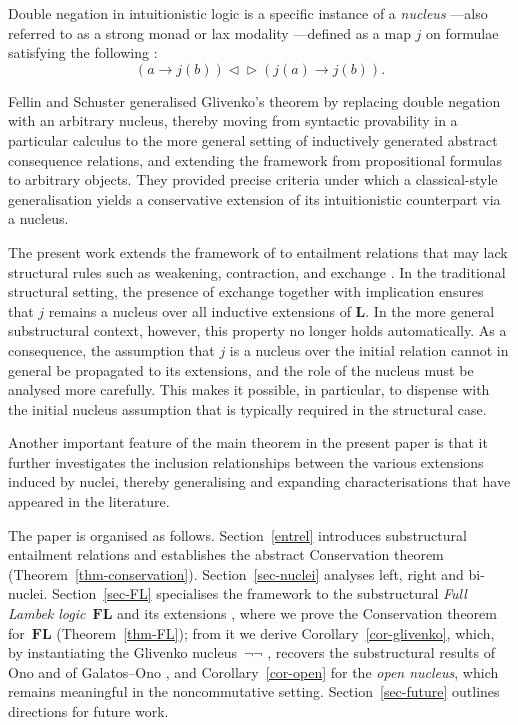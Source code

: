 \documentclass[runningheads]{llncs}
\newcommand{\FL}{\mathbf{FL}}
\begin{document}
Double negation in intuitionistic logic is a specific instance of a \emph{nucleus} \cite{aczel:aspects,hayk:more,joh:sto,negri:cont,rosen,simm:frame,simm:cur}---also referred to as a strong monad \cite{kock:sdg} or lax modality \cite{aczel_2001}---defined as a map $j$ on formulae satisfying the following \cite{van:kuroda}:
\[
(a \to j(b)) \lhd\!\!\rhd (j(a) \to j(b)).
\]

Fellin and Schuster \cite{fel:nuclei,fel:cat} generalised Glivenko's theorem by replacing double negation with an arbitrary nucleus, thereby moving from syntactic provability in a particular calculus to the more general setting of inductively generated abstract consequence relations, and extending the framework from propositional formulas to arbitrary objects. They provided precise criteria under which a classical-style generalisation yields a conservative extension of its intuitionistic counterpart via a nucleus.

The present work extends the framework of \cite{fel:nuclei,fel:cat} to entailment relations that may lack structural rules such as weakening, contraction, and exchange \cite{PAOLI,restall:sub}. In the traditional structural setting, the presence of exchange together with implication ensures that $j$ remains a nucleus over all inductive extensions of $\mathbf{L}$. In the more general substructural context, however, this property no longer holds automatically. As a consequence, the assumption that $j$ is a nucleus over the initial relation cannot in general be propagated to its extensions, and the role of the nucleus must be analysed more carefully. This makes it possible, in particular, to dispense with the initial nucleus assumption that is typically required in the structural case.

Another important feature of the main theorem in the present paper is that it further investigates the inclusion relationships between the various extensions induced by nuclei, thereby generalising and expanding characterisations that have appeared in the literature.

The paper is organised as follows. Section~\ref{entrel} introduces substructural entailment relations and establishes the abstract Conservation theorem (Theorem~\ref{thm-conservation}). Section~\ref{sec-nuclei} analyses left, right and bi-nuclei. Section~\ref{sec-FL} specialises the framework to the substructural \emph{Full Lambek logic}~$\FL$ and its extensions \cite{Lambek1958TheMO,Lambek1961OnTC,Lambek1995SomeLM}, where we prove the Conservation theorem for~$\FL$ (Theorem~\ref{thm-FL}); from it we derive Corollary~\ref{cor-glivenko}, which, by instantiating the Glivenko nucleus~$\neg\neg$ \cite{van:kuroda,esca:peirce}, recovers the substructural results of Ono and of Galatos--Ono \cite{GO:glitsl,ResLat,ono:gli}, and Corollary~\ref{cor-open} for the \emph{open nucleus}, which remains meaningful in the noncommutative setting. Section~\ref{sec-future} outlines directions for future work.
\end{document}
